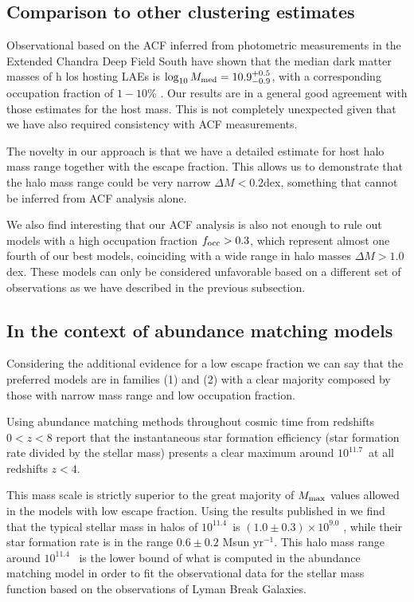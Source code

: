 \documentclass[usenatbib]{mn2e}
\newcommand{\hMsun}{{\ifmmode{h^{-1}{\rm
        {M_{\odot}}}}\else{$h^{-1}{\rm{M_{\odot}}}$}\fi}}
\newcommand{\Msun}{{\ifmmode{{\rm {M_{\odot}}}}\else{${\rm{M_{\odot}}}$}\fi}}
\begin{document}
\subsection{Comparison to other clustering estimates}

Observational based on the ACF inferred from photometric measurements
in the Extended Chandra Deep Field South have shown that the median
dark matter masses of h los hosting LAEs is $\log_{10}M_{\rm
  med}=10.9^{+0.5}_{-0.9}$\Msun, with a corresponding occupation
fraction of $1-10\%$  \citep{Gawiser07}.  Our results are in a general
good agreement with those estimates for the host mass. This is not
completely unexpected given that we have also required consistency
with ACF measurements.   

The novelty in our approach is that we have a detailed estimate for 
host halo mass range together with the escape fraction. This allows us
to demonstrate that the halo mass range could be very narrow $\Delta M <
0.2$dex, something that cannot be inferred from ACF analysis
alone. 

We also find interesting that our ACF analysis is also not enough to rule
out models with a high occupation fraction $f_{\rm occ}>0.3$, which
represent almost one fourth of our best models, coinciding with a wide
range in halo masses $\Delta M>1.0$ dex. These models can only be
considered unfavorable based on a different set of observations as we
have described in the previous subsection.


\subsection{In the context of abundance matching models}


Considering the additional evidence for a low escape fraction we can
say that the preferred models are in families (1) and (2) with a
clear majority composed by those with narrow mass range and low occupation
fraction.  

Using abundance matching methods throughout cosmic time from redshifts
$0<z<8$ \cite{Behroozi2013a,Behroozi2013b} report that the instantaneous star
formation efficiency (star formation rate divided by the stellar mass)
presents a clear maximum around $10^{11.7}$\Msun \ at all redshifts
$z<4$.

This mass scale is strictly superior to the great majority of  $M_{\rm max}$
values allowed in the models with low escape fraction. Using the results published
in \cite{Behroozi2013a} we find that the typical stellar mass in halos
of $10^{11.4}$\hMsun \ is $(1.0\pm0.3)\times 10^{9.0}$ \hMsun, while
their star formation rate is in the range $0.6\pm 0.2$ Msun yr$^{-1}$.
This halo mass range around $10^{11.4}$ \hMsun \ is the lower bound of
what is computed in the abundance matching model in order to fit the
observational data for the stellar mass function based on the
observations of Lyman Break Galaxies. 
\end{document}
